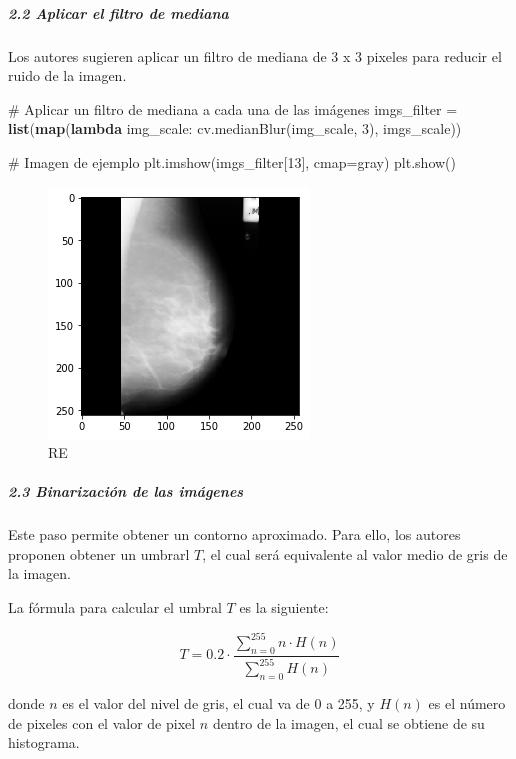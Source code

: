 \documentclass[
]{article}
\newenvironment{Shaded}{\begin{snugshade}}{\end{snugshade}}
\newcommand{\BuiltInTok}[1]{\textcolor[rgb]{0.39,0.29,0.61}{\textbf{#1}}}
\newcommand{\CommentTok}[1]{\textcolor[rgb]{0.54,0.53,0.53}{#1}}
\newcommand{\DecValTok}[1]{\textcolor[rgb]{0.69,0.50,0.00}{#1}}
\newcommand{\KeywordTok}[1]{\textcolor[rgb]{0.12,0.11,0.11}{\textbf{#1}}}
\newcommand{\NormalTok}[1]{\textcolor[rgb]{0.12,0.11,0.11}{#1}}
\newcommand{\OperatorTok}[1]{\textcolor[rgb]{0.12,0.11,0.11}{#1}}
\newcommand{\StringTok}[1]{\textcolor[rgb]{0.75,0.01,0.01}{#1}}
\begin{document}
\hypertarget{aplicar-el-filtro-de-mediana}{%
\subparagraph{2.2 Aplicar el filtro de
mediana}\label{aplicar-el-filtro-de-mediana}}

Los autores sugieren aplicar un filtro de mediana de 3 x 3 pixeles para
reducir el ruido de la imagen.

\begin{Shaded}
\begin{Highlighting}[]
\CommentTok{\# Aplicar un filtro de mediana a cada una de las imágenes}
\NormalTok{imgs\_filter }\OperatorTok{=} \BuiltInTok{list}\NormalTok{(}\BuiltInTok{map}\NormalTok{(}\KeywordTok{lambda}\NormalTok{ img\_scale: cv.medianBlur(img\_scale, }\DecValTok{3}\NormalTok{), imgs\_scale))}

\CommentTok{\# Imagen de ejemplo}
\NormalTok{plt.imshow(imgs\_filter[}\DecValTok{13}\NormalTok{], cmap}\OperatorTok{=}\StringTok{\textquotesingle{}gray\textquotesingle{}}\NormalTok{)}
\NormalTok{plt.show()}
\end{Highlighting}
\end{Shaded}

\begin{figure}
\centering
\includegraphics{img/tarea_2_2.png}
\caption{RE}
\end{figure}

\hypertarget{binarizaciuxf3n-de-las-imuxe1genes}{%
\subparagraph{2.3 Binarización de las
imágenes}\label{binarizaciuxf3n-de-las-imuxe1genes}}

Este paso permite obtener un contorno aproximado. Para ello, los autores
proponen obtener un umbrarl \(T\), el cual será equivalente al valor
medio de gris de la imagen.

La fórmula para calcular el umbral \(T\) es la siguiente:

\[T = 0.2 \cdot  \frac{\sum_{n = 0}^{255} n \cdot H(n)}{\sum_{n = 0}^{255} H(n)}\]

donde \(n\) es el valor del nivel de gris, el cual va de 0 a 255, y
\(H(n)\) es el número de pixeles con el valor de pixel \(n\) dentro de
la imagen, el cual se obtiene de su histograma.
\end{document}
